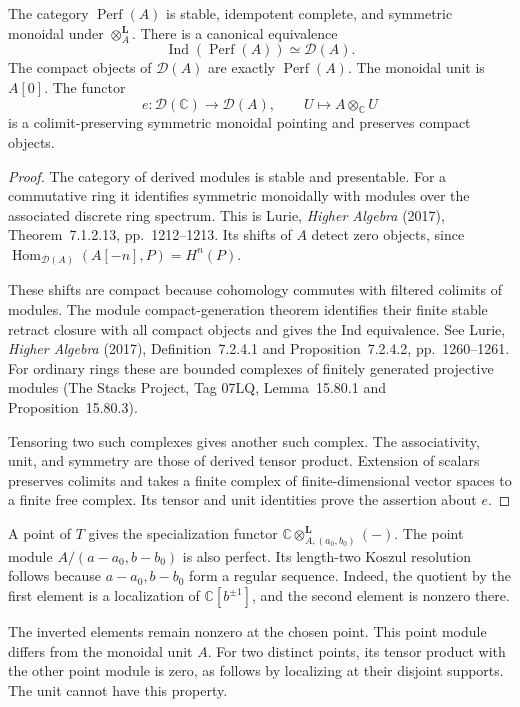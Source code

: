 \begin{proposition}
\label{v4-arith:ic:eis:parameter-perf}
The category $\operatorname{Perf}(A)$ is stable, idempotent complete,
and symmetric monoidal under $\otimes_A^{\mathbf L}$.
There is a canonical equivalence
\[
 \operatorname{Ind}(\operatorname{Perf}(A))\simeq\mathcal D(A).
\]
The compact objects of $\mathcal D(A)$ are exactly $\operatorname{Perf}(A)$.
The monoidal unit is $A[0]$.
The functor
\[
 e:\mathcal D(\mathbb C)\longrightarrow\mathcal D(A),
 \qquad U\longmapsto A\otimes_{\mathbb C}U
\]
is a colimit-preserving symmetric monoidal pointing and preserves compact objects.
\end{proposition}

\begin{proof}
The category of derived modules is stable and presentable.
For a commutative ring it identifies symmetric monoidally with
modules over the associated discrete ring spectrum.
This is Lurie, \emph{Higher Algebra} (2017),
Theorem~7.1.2.13, pp.~1212--1213.
Its shifts of $A$ detect zero objects, since
$\operatorname{Hom}_{\mathcal D(A)}(A[-n],P)=H^n(P)$.

These shifts are compact because cohomology commutes with filtered colimits of modules.
The module compact-generation theorem identifies their finite
stable retract closure with all compact objects and gives the Ind equivalence.
See Lurie, \emph{Higher Algebra} (2017), Definition~7.2.4.1
and Proposition~7.2.4.2, pp.~1260--1261.
For ordinary rings these are bounded complexes of finitely generated projective modules
(The Stacks Project, Tag 07LQ, Lemma~15.80.1 and Proposition~15.80.3).

Tensoring two such complexes gives another such complex.
The associativity, unit, and symmetry are those of derived tensor product.
Extension of scalars preserves colimits and takes a finite complex of
finite-dimensional vector spaces to a finite free complex.
Its tensor and unit identities prove the assertion about $e$.
\end{proof}

A point of $T$ gives the specialization functor
$\mathbb C\otimes_{A,(a_0,b_0)}^{\mathbf L}(-)$.
The point module $A/(a-a_0,b-b_0)$ is also perfect.
Its length-two Koszul resolution follows because $a-a_0,b-b_0$ form a regular sequence.
Indeed, the quotient by the first element is a localization of
$\mathbb C[b^{\pm1}]$, and the second element is nonzero there.

The inverted elements remain nonzero at the chosen point.
This point module differs from the monoidal unit $A$.
For two distinct points, its tensor product with the other point module is zero,
as follows by localizing at their disjoint supports.
The unit cannot have this property.

